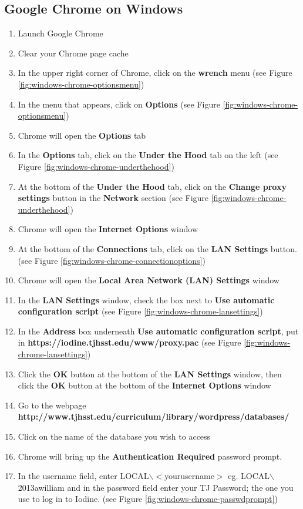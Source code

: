 \documentclass{article}
\newcommand{\proxypacurl}{https://iodine.tjhsst.edu/www/proxy.pac}
\newcommand{\librarydbpage}{http://www.tjhsst.edu/curriculum/library/wordpress/databases/}
\begin{document}
\begin{flushleft}
\section{Google Chrome on Windows}
\begin{enumerate}
\item Launch Google Chrome
\item Clear your Chrome page cache
\item In the upper right corner of Chrome, click on the \textbf{wrench} menu (see Figure \ref{fig:windows-chrome-optionsmenu})
\item In the menu that appears, click on \textbf{Options} (see Figure \ref{fig:windows-chrome-optionsmenu})
\item Chrome will open the \textbf{Options} tab
\item In the \textbf{Options} tab, click on the \textbf{Under the Hood} tab on the left (see Figure \ref{fig:windows-chrome-underthehood})
\item At the bottom of the \textbf{Under the Hood} tab, click on the \textbf{Change proxy settings} button in the \textbf{Network} section (see Figure \ref{fig:windows-chrome-underthehood})
\item Chrome will open the \textbf{Internet Options} window
\item At the bottom of the \textbf{Connections} tab, click on the \textbf{LAN Settings} button. (see Figure \ref{fig:windows-chrome-connectionoptions})
\item Chrome will open the \textbf{Local Area Network (LAN) Settings} window
\item In the \textbf{LAN Settings} window, check the box next to \textbf{Use automatic configuration script} (see Figure \ref{fig:windows-chrome-lansettings})
\item In the \textbf{Address} box underneath \textbf{Use automatic configuration script}, put in \linebreak\textbf{\proxypacurl} (see Figure \ref{fig:windows-chrome-lansettings})
\item Click the \textbf{OK} button at the bottom of the \textbf{LAN Settings} window, then click the \textbf{OK} button at the bottom of the \textbf{Internet Options} window
\item Go to the webpage \textbf{\librarydbpage}
\item Click on the name of the database you wish to access
\item Chrome will bring up the \textbf{Authentication Required} password prompt.
\item In the username field, enter LOCAL$\backslash$$<$yourusername$>$ eg. LOCAL$\backslash$2013awilliam and in the password field enter your TJ Password; the one you use to log in to Iodine. (see Figure \ref{fig:windows-chrome-passwdprompt})
$$
\end{enumerate}
\end{flushleft}
\end{document}

